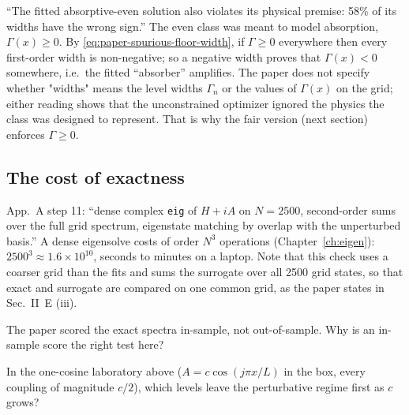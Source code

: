 ``The fitted absorptive-even solution also violates its physical premise: 58\% of its widths have the wrong sign.'' The even class was meant to model absorption, $\Gamma(x)\ge0$. By \cref{eq:paper-spurious-floor-width}, if $\Gamma\ge0$ everywhere then every first-order width is non-negative; so a negative width proves that $\Gamma(x)<0$ somewhere, i.e.\ the fitted ``absorber'' amplifies. The paper does not specify whether "widths" means the level widths $\Gamma_n$ or the values of $\Gamma(x)$ on the grid; either reading shows that the unconstrained optimizer ignored the physics the class was designed to represent. That is why the fair version (next section) enforces $\Gamma\ge0$.

\subsection{The cost of exactness}

App.~A step 11: ``dense complex \texttt{eig} of $H+iA$ on $N=2500$, second-order sums over the full grid spectrum, eigenstate matching by overlap with the unperturbed basis.'' A dense eigensolve costs of order $N^3$ operations (Chapter~\ref{ch:eigen}): $2500^3\approx1.6\times10^{10}$, seconds to minutes on a laptop. Note that this check uses a coarser grid than the fits and sums the surrogate over all 2500 grid states, so that exact and surrogate are compared on one common grid, as the paper states in Sec.~II~E (iii).

\begin{checkpoint}
The paper scored the exact spectra in-sample, not out-of-sample. Why is an in-sample score the right test here?
\end{checkpoint}

\begin{checkpoint}
In the one-cosine laboratory above ($A=c\cos(j\pi x/L)$ in the box, every coupling of magnitude $c/2$), which levels leave the perturbative regime first as $c$ grows?
\end{checkpoint}

